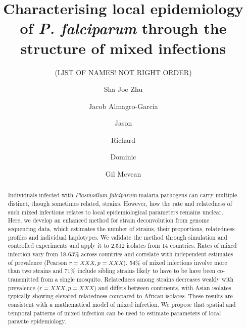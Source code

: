 \documentclass{article}
\newcounter{todocounter}
\newcommand{\done}[2][]
{\todo[color=green!40, #1]{#2}}
\newcommand{\donenum}[2][]
{\stepcounter{todocounter}\done[#1]{\thetodocounter: #2}}
\begin{document}
\title{Characterising local epidemiology of {\it P. falciparum} through the structure of mixed infections}
\newcommand\shorttitle{Mixed infections in malaria}
\date{}

\author{(LIST OF NAMES! NOT RIGHT ORDER)}
\author[1]{Sha Joe Zhu}
\author[1,2,3,4]{Jacob Almagro-Garcia}
\author[1]{Jason}
\author[2,3,4]{Richard}
\author[1,2,3,4]{Dominic}
\author[1,3]{Gil Mcvean}



\maketitle
{}
\listoftodos
{}





\begin{abstract}
Individuals infected with {\it Plasmodium falciparum} malaria pathogens can carry multiple distinct, though sometimes related, strains.  However, how the rate and relatedness of such mixed infections relates to local epidemiological parameters remains unclear.  Here, we develop an enhanced method for strain deconvolution from genome sequencing data, which estimates the number of strains, their proportions, relatedness profiles and individual haplotypes.  We validate the method through simulation and controlled experiments and apply it to 2,512 isolates from 14 countries.  Rates of mixed infection vary from 18-63\% across countries and correlate with independent estimates of prevalence (Pearson $r = XXX, p = XXX$).  54\% of mixed infections involve more than two strains and 71\% include sibling strains likely to have to be have been co-transmitted from a single mosquito.  Relatedness among strains decreases weakly with prevalence ($r = XXX, p = XXX$) and differs between continents, with Asian isolates typically showing elevated relatedness compared to African isolates.  These results are consistent with a mathematical model of mixed infection.  We propose that spatial and temporal patterns of mixed infection can be used to estimate parameters of local parasite epidemiology.  
\end{abstract}
\end{document}
